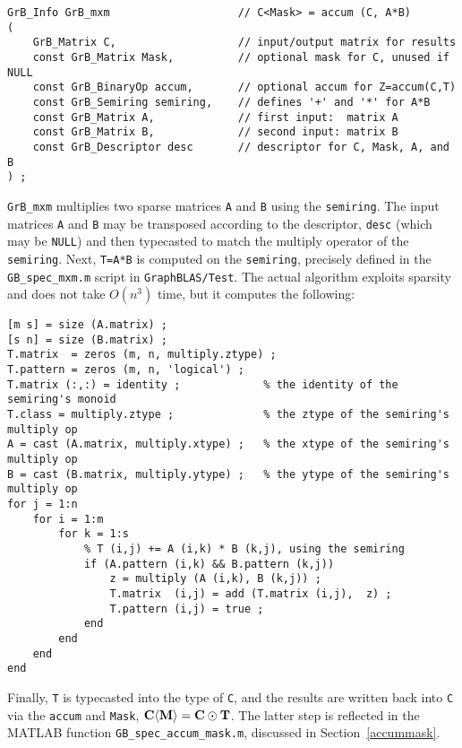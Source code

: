 \documentclass[12pt]{article}
\begin{document}
\begin{mdframed}[userdefinedwidth=6in]
{\footnotesize
\begin{verbatim}
GrB_Info GrB_mxm                    // C<Mask> = accum (C, A*B)
(
    GrB_Matrix C,                   // input/output matrix for results
    const GrB_Matrix Mask,          // optional mask for C, unused if NULL
    const GrB_BinaryOp accum,       // optional accum for Z=accum(C,T)
    const GrB_Semiring semiring,    // defines '+' and '*' for A*B
    const GrB_Matrix A,             // first input:  matrix A
    const GrB_Matrix B,             // second input: matrix B
    const GrB_Descriptor desc       // descriptor for C, Mask, A, and B
) ;
\end{verbatim} } \end{mdframed}

\verb'GrB_mxm' multiplies two sparse matrices \verb'A' and \verb'B' using the
\verb'semiring'.  The input matrices \verb'A' and \verb'B' may be transposed
according to the descriptor, \verb'desc' (which may be \verb'NULL') and then
typecasted to match the multiply operator of the \verb'semiring'.  Next,
\verb'T=A*B' is computed on the \verb'semiring', precisely defined in the
\verb'GB_spec_mxm.m' script in \verb'GraphBLAS/Test'.  The actual algorithm
exploits sparsity and does not take $O(n^3)$ time, but it computes the
following:

{\footnotesize
\begin{verbatim}
[m s] = size (A.matrix) ;
[s n] = size (B.matrix) ;
T.matrix  = zeros (m, n, multiply.ztype) ;
T.pattern = zeros (m, n, 'logical') ;
T.matrix (:,:) = identity ;             % the identity of the semiring's monoid
T.class = multiply.ztype ;              % the ztype of the semiring's multiply op
A = cast (A.matrix, multiply.xtype) ;   % the xtype of the semiring's multiply op
B = cast (B.matrix, multiply.ytype) ;   % the ytype of the semiring's multiply op
for j = 1:n
    for i = 1:m
        for k = 1:s
            % T (i,j) += A (i,k) * B (k,j), using the semiring
            if (A.pattern (i,k) && B.pattern (k,j))
                z = multiply (A (i,k), B (k,j)) ;
                T.matrix  (i,j) = add (T.matrix (i,j),  z) ;
                T.pattern (i,j) = true ;
            end
        end
    end
end \end{verbatim}}

Finally, \verb'T' is typecasted into the type of \verb'C', and the results are
written back into \verb'C' via the \verb'accum' and \verb'Mask', ${\bf C
\langle M \rangle  = C \odot T}$.  The latter step is reflected in the MATLAB
function \verb'GB_spec_accum_mask.m', discussed in Section~\ref{accummask}.
\end{document}
